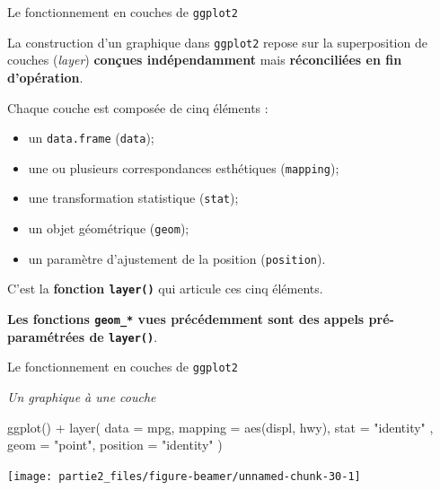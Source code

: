 \documentclass[12pt,ignorenonframetext,]{beamer}
\newenvironment{Shaded}{}{}
\newcommand{\DataTypeTok}[1]{#1}
\newcommand{\KeywordTok}[1]{\textcolor[rgb]{0.00,0.00,1.00}{#1}}
\newcommand{\NormalTok}[1]{#1}
\newcommand{\OperatorTok}[1]{#1}
\newcommand{\StringTok}[1]{\textcolor[rgb]{0.00,0.50,0.50}{#1}}
\providecommand{\tightlist}{%
  \setlength{\itemsep}{0pt}\setlength{\parskip}{0pt}}
\renewenvironment{Shaded}{\begin{snugshade}}{\end{snugshade}}
\begin{document}
\begin{frame}[fragile]{\large Le fonctionnement en \og couches \fg{} de
\texttt{ggplot2}}
\protect\hypertarget{le-fonctionnement-en-couches-de-ggplot2}{}

La construction d’un graphique dans \texttt{ggplot2} repose sur la
superposition de couches (\emph{layer}) \textbf{conçues indépendamment}
mais \textbf{réconciliées en fin d’opération}.

\pause Chaque couche est composée de cinq éléments :

\begin{itemize}
\tightlist
\item
  un \texttt{data.frame} (\texttt{data});
\item
  une ou plusieurs correspondances esthétiques (\texttt{mapping});
\item
  une transformation statistique (\texttt{stat});
\item
  un objet géométrique (\texttt{geom});
\item
  un paramètre d’ajustement de la position (\texttt{position}).
\end{itemize}

C’est la \textbf{fonction \texttt{layer()}} qui articule ces cinq
éléments.

\pause

\textbf{Les fonctions \texttt{geom\_*} vues précédemment sont des appels
pré-paramétrées de \texttt{layer()}}.

\end{frame}

\begin{frame}[fragile]{\large Le fonctionnement en \og couches \fg{} de
\texttt{ggplot2}}
\protect\hypertarget{le-fonctionnement-en-couches-de-ggplot2-1}{}

\emph{Un graphique à une couche}

\footnotesize \centering

\begin{Shaded}
\begin{Highlighting}[]
\KeywordTok{ggplot}\NormalTok{() }\OperatorTok{+}\StringTok{ }\KeywordTok{layer}\NormalTok{(}
  \DataTypeTok{data =}\NormalTok{ mpg, }\DataTypeTok{mapping =} \KeywordTok{aes}\NormalTok{(displ, hwy), }\DataTypeTok{stat =} \StringTok{"identity"}
\NormalTok{  , }\DataTypeTok{geom =} \StringTok{"point"}\NormalTok{, }\DataTypeTok{position =} \StringTok{"identity"}
\NormalTok{)}
\end{Highlighting}
\end{Shaded}

\texttt{[image: partie2\_files/figure-beamer/unnamed-chunk-30-1]}

\end{frame}
\end{document}
